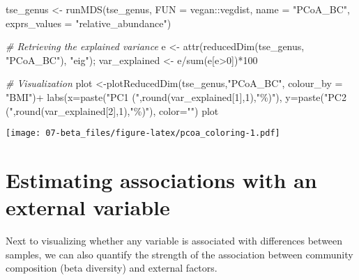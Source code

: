 \documentclass[
  oneside]{book}
\newenvironment{Shaded}{\begin{snugshade}}{\end{snugshade}}
\newcommand{\AttributeTok}[1]{\textcolor[rgb]{0.77,0.63,0.00}{#1}}
\newcommand{\CommentTok}[1]{\textcolor[rgb]{0.56,0.35,0.01}{\textit{#1}}}
\newcommand{\DecValTok}[1]{\textcolor[rgb]{0.00,0.00,0.81}{#1}}
\newcommand{\FunctionTok}[1]{\textcolor[rgb]{0.00,0.00,0.00}{#1}}
\newcommand{\NormalTok}[1]{#1}
\newcommand{\OtherTok}[1]{\textcolor[rgb]{0.56,0.35,0.01}{#1}}
\newcommand{\SpecialCharTok}[1]{\textcolor[rgb]{0.00,0.00,0.00}{#1}}
\newcommand{\StringTok}[1]{\textcolor[rgb]{0.31,0.60,0.02}{#1}}
\begin{document}
\begin{Shaded}
\begin{Highlighting}[]
\NormalTok{tse\_genus }\OtherTok{\textless{}{-}} \FunctionTok{runMDS}\NormalTok{(tse\_genus, }\AttributeTok{FUN =}\NormalTok{ vegan}\SpecialCharTok{::}\NormalTok{vegdist,}
              \AttributeTok{name =} \StringTok{"PCoA\_BC"}\NormalTok{, }\AttributeTok{exprs\_values =} \StringTok{"relative\_abundance"}\NormalTok{)}

\CommentTok{\# Retrieving the explained variance}
\NormalTok{e }\OtherTok{\textless{}{-}} \FunctionTok{attr}\NormalTok{(}\FunctionTok{reducedDim}\NormalTok{(tse\_genus, }\StringTok{"PCoA\_BC"}\NormalTok{), }\StringTok{"eig"}\NormalTok{);}
\NormalTok{var\_explained }\OtherTok{\textless{}{-}}\NormalTok{ e}\SpecialCharTok{/}\FunctionTok{sum}\NormalTok{(e[e}\SpecialCharTok{\textgreater{}}\DecValTok{0}\NormalTok{])}\SpecialCharTok{*}\DecValTok{100}

\CommentTok{\# Visualization}
\NormalTok{plot }\OtherTok{\textless{}{-}}\FunctionTok{plotReducedDim}\NormalTok{(tse\_genus,}\StringTok{"PCoA\_BC"}\NormalTok{, }\AttributeTok{colour\_by =} \StringTok{"BMI"}\NormalTok{)}\SpecialCharTok{+}
  \FunctionTok{labs}\NormalTok{(}\AttributeTok{x=}\FunctionTok{paste}\NormalTok{(}\StringTok{"PC1 ("}\NormalTok{,}\FunctionTok{round}\NormalTok{(var\_explained[}\DecValTok{1}\NormalTok{],}\DecValTok{1}\NormalTok{),}\StringTok{"\%)"}\NormalTok{),}
       \AttributeTok{y=}\FunctionTok{paste}\NormalTok{(}\StringTok{"PC2 ("}\NormalTok{,}\FunctionTok{round}\NormalTok{(var\_explained[}\DecValTok{2}\NormalTok{],}\DecValTok{1}\NormalTok{),}\StringTok{"\%)"}\NormalTok{),}
       \AttributeTok{color=}\StringTok{""}\NormalTok{)}
\NormalTok{plot}
\end{Highlighting}
\end{Shaded}

\texttt{[image: 07-beta\_files/figure-latex/pcoa\_coloring-1.pdf]}

\hypertarget{estimating-associations-with-an-external-variable}{%
\section{Estimating associations with an external variable}\label{estimating-associations-with-an-external-variable}}

Next to visualizing whether any variable is associated with
differences between samples, we can also quantify the strength of the
association between community composition (beta diversity) and
external factors.
\end{document}
